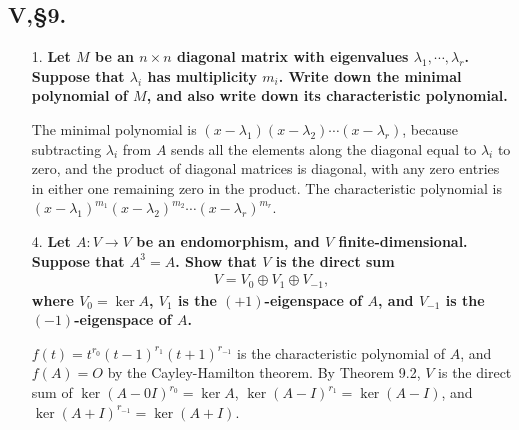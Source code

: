 \documentclass[12pt]{article}
\begin{document}
\subsection*{V,\S9.}
\begin{enumerate}
    \item[1.]
        \boldmath\textbf{Let $M$ be an $n \times n$ diagonal matrix with eigenvalues $\lambda_1, \cdots, \lambda_r$. Suppose that $\lambda_i$ has multiplicity $m_i$. Write down the minimal polynomial of $M$, and also write down its characteristic polynomial.
        }\unboldmath \par
        The minimal polynomial is $(x - \lambda_1)(x - \lambda_2)\cdots(x - \lambda_r)$, because subtracting $\lambda_i$ from $A$ sends all the elements along the diagonal equal to $\lambda_i$ to zero, and the product of diagonal matrices is diagonal, with any zero entries in either one remaining zero in the product. The characteristic polynomial is $(x - \lambda_1)^{m_1} (x - \lambda_2)^{m_2} \cdots (x - \lambda_r)^{m_r}$.

    \item[4.]
        \boldmath\textbf{Let $A : V \to V$ be an endomorphism, and $V$ finite-dimensional. Suppose that $A^3 = A$. Show that $V$ is the direct sum
            \begin{align*}
                V = V_0 \oplus V_1 \oplus V_{-1},
            \end{align*}
            where $V_0 = \ker A$, $V_1$ is the $(+1)$-eigenspace of $A$, and $V_{-1}$ is the $(-1)$-eigenspace of $A$.
        }\unboldmath \par
        $f(t) = t^{r_0} (t - 1)^{r_1} (t + 1)^{r_{-1}}$ is the characteristic polynomial of $A$, and $f(A) = O$ by the Cayley-Hamilton theorem. By Theorem 9.2, $V$ is the direct sum of $\ker(A - 0I)^{r_0} = \ker A$, $\ker(A - I)^{r_1} = \ker(A - I)$, and $\ker(A + I)^{r_{-1}} = \ker(A + I)$.


\end{enumerate}
\end{document}
